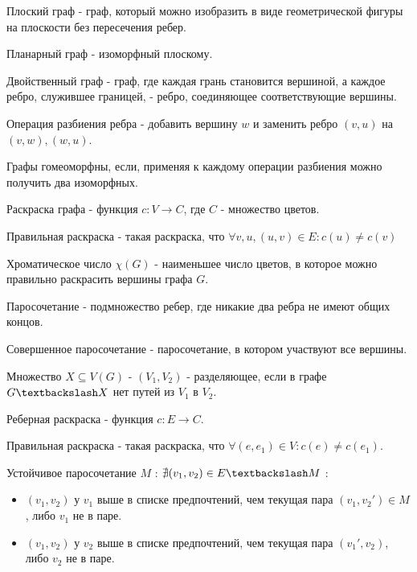 \documentclass[12pt]{article}
\begin{document}
\begin{defn}
   Плоский граф - граф, который можно изобразить в виде геометрической фигуры на плоскости без пересечения ребер.
\end{defn}
\begin{defn}
    Планарный граф - изоморфный плоскому.
\end{defn}
\begin{defn}
    Двойственный граф - граф, где каждая грань становится вершиной, а каждое ребро, служившее границей, - ребро, соединяющее соответствующие вершины.
\end{defn}
\begin{defn}
    Операция разбиения ребра - добавить вершину $w$ и заменить ребро $(v, u)$ на $(v, w), (w, u)$.
\end{defn}
\begin{defn}
    Графы гомеоморфны, если, применяя к каждому операции разбиения можно получить два изоморфных.
\end{defn}
\begin{defn}
    Раскраска графа - функция $c: V \to C$, где $C$ - множество цветов.
\end{defn}
\begin{defn}
    Правильная раскраска - такая раскраска,  что $\forall v, u , (u, v) \in E: c(u) \ne c(v)$
\end{defn}
\begin{defn}
    Хроматическое число $\chi(G)$ - наименьшее число цветов, в которое можно правильно раскрасить вершины графа $G$.
\end{defn}
\begin{defn}
    Паросочетание - подмножество ребер, где никакие два ребра не имеют общих концов.
\end{defn}
\begin{defn}
    Совершенное паросочетание - паросочетание, в котором участвуют все вершины.
\end{defn}
\begin{defn}
    Множество $X \subseteq V(G)$ - $(V_1, V_2)$ - разделяющее, если в графе  $G \textbackslash X$ нет путей из $V_1$ в $V_2$.
\end{defn}
\begin{defn}
    Реберная раскраска - функция $c: E \to C$.
\end{defn}
\begin{defn}
    Правильная раскраска - такая раскраска, что $\forall (e, e_1) \in V: c(e) \ne c(e_1)$.
\end{defn}
\begin{defn}
    Устойчивое паросочетание $M$ : $\nexists (v_1, v_2) \in  E \textbackslash M$ :
    \begin{itemize}
	\item $(v_1, v_2)$ у $v_1$ выше в списке предпочтений, чем текущая пара $(v_1, v_2 \prime) \in  M$, либо $v_1$ не в паре.
	\item $(v_1, v_2)$ у $v_2$ выше в списке предпочтений, чем текущая пара $(v_1\prime, v_2)$, либо $v_2$ не в паре.
    \end{itemize}
\end{defn}
\end{document}
